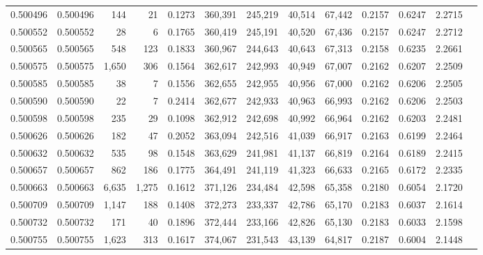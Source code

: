 \begin{tabular}{rrrrrrrrrrrrr}
0.500496 & 0.500496 &   144 &    21 &                                     0.1273 & 360,391 & 245,219 &  40,514 &  67,442 & 0.2157 & 0.6247 & 2.2715 \\
0.500552 & 0.500552 &    28 &     6 &                                     0.1765 & 360,419 & 245,191 &  40,520 &  67,436 & 0.2157 & 0.6247 & 2.2712 \\
0.500565 & 0.500565 &   548 &   123 &                                     0.1833 & 360,967 & 244,643 &  40,643 &  67,313 & 0.2158 & 0.6235 & 2.2661 \\
0.500575 & 0.500575 & 1,650 &   306 &                                     0.1564 & 362,617 & 242,993 &  40,949 &  67,007 & 0.2162 & 0.6207 & 2.2509 \\
0.500585 & 0.500585 &    38 &     7 &                                     0.1556 & 362,655 & 242,955 &  40,956 &  67,000 & 0.2162 & 0.6206 & 2.2505 \\
0.500590 & 0.500590 &    22 &     7 &                                     0.2414 & 362,677 & 242,933 &  40,963 &  66,993 & 0.2162 & 0.6206 & 2.2503 \\
0.500598 & 0.500598 &   235 &    29 &                                     0.1098 & 362,912 & 242,698 &  40,992 &  66,964 & 0.2162 & 0.6203 & 2.2481 \\
0.500626 & 0.500626 &   182 &    47 &                                     0.2052 & 363,094 & 242,516 &  41,039 &  66,917 & 0.2163 & 0.6199 & 2.2464 \\
0.500632 & 0.500632 &   535 &    98 &                                     0.1548 & 363,629 & 241,981 &  41,137 &  66,819 & 0.2164 & 0.6189 & 2.2415 \\
0.500657 & 0.500657 &   862 &   186 &                                     0.1775 & 364,491 & 241,119 &  41,323 &  66,633 & 0.2165 & 0.6172 & 2.2335 \\
0.500663 & 0.500663 & 6,635 & 1,275 &                                     0.1612 & 371,126 & 234,484 &  42,598 &  65,358 & 0.2180 & 0.6054 & 2.1720 \\
0.500709 & 0.500709 & 1,147 &   188 &                                     0.1408 & 372,273 & 233,337 &  42,786 &  65,170 & 0.2183 & 0.6037 & 2.1614 \\
0.500732 & 0.500732 &   171 &    40 &                                     0.1896 & 372,444 & 233,166 &  42,826 &  65,130 & 0.2183 & 0.6033 & 2.1598 \\
0.500755 & 0.500755 & 1,623 &   313 &                                     0.1617 & 374,067 & 231,543 &  43,139 &  64,817 & 0.2187 & 0.6004 & 2.1448 \\

\end{tabular}
